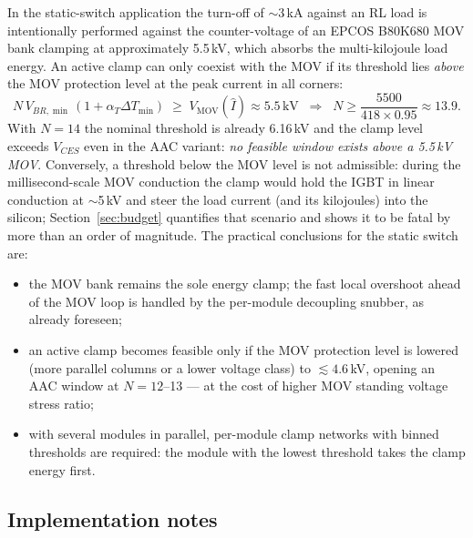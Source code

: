 \documentclass[11pt,a4paper]{article}
\begin{document}
In the static-switch application \cite{ssprop} the turn-off of
$\sim$3\,kA against an RL load is intentionally performed against the
counter-voltage of an EPCOS B80K680 MOV bank clamping at approximately
5.5\,kV, which absorbs the multi-kilojoule load energy. An active clamp
can only coexist with the MOV if its threshold lies \emph{above} the
MOV protection level at the peak current in all corners:
%
\begin{equation}
  N\,V_{BR,\min}\,(1+\alpha_T\Delta T_{\min}) \;\ge\; V_{\mathrm{MOV}}(\hat{I})
  \approx 5.5\,\mathrm{kV}
  \;\;\Rightarrow\;\;
  N \ge \frac{5500}{418\times0.95} \approx 13.9 .
\end{equation}
%
With $N=14$ the nominal threshold is already 6.16\,kV and the clamp
level exceeds $V_{CES}$ even in the AAC variant: \emph{no feasible
window exists above a 5.5\,kV MOV}. Conversely, a threshold below the
MOV level is not admissible: during the millisecond-scale MOV
conduction the clamp would hold the IGBT in linear conduction at
$\sim$5\,kV and steer the load current (and its kilojoules) into the
silicon; Section~\ref{sec:budget} quantifies that scenario and shows it
to be fatal by more than an order of magnitude. The practical conclusions for the static switch are:
%
\begin{itemize}
  \item the MOV bank remains the sole energy clamp; the fast local
        overshoot ahead of the MOV loop is handled by the per-module
        decoupling snubber, as already foreseen;
  \item an active clamp becomes feasible only if the MOV protection
        level is lowered (more parallel columns or a lower voltage
        class) to $\lesssim 4.6$\,kV, opening an AAC window at
        $N=12$--13 --- at the cost of higher MOV standing voltage
        stress ratio;
  \item with several modules in parallel, per-module clamp networks
        with binned thresholds are required: the module with the lowest
        threshold takes the clamp energy first.
\end{itemize}

\subsection{Implementation notes}
\end{document}

